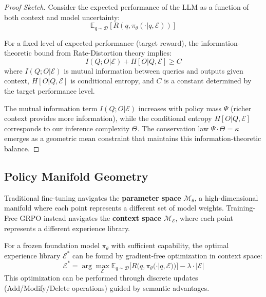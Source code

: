 \begin{proof}[Proof Sketch]
Consider the expected performance of the LLM as a function of both context and model uncertainty:
\begin{equation}
\mathbb{E}_{q \sim \mathcal{D}}[R(q, \pi_\theta(\cdot | q, \mathcal{E}))]
\end{equation}

For a fixed level of expected performance (target reward), the information-theoretic bound from Rate-Distortion theory \cite{cover1999elements} implies:
\begin{equation}
I(Q; O | \mathcal{E}) + H[O | Q, \mathcal{E}] \geq C
\end{equation}
where $I(Q; O | \mathcal{E})$ is mutual information between queries and outputs given context, $H[O | Q, \mathcal{E}]$ is conditional entropy, and $C$ is a constant determined by the target performance level.

The mutual information term $I(Q; O | \mathcal{E})$ increases with policy mass $\Psi$ (richer context provides more information), while the conditional entropy $H[O | Q, \mathcal{E}]$ corresponds to our inference complexity $\Theta$. The conservation law $\Psi \cdot \Theta = \kappa$ emerges as a geometric mean constraint that maintains this information-theoretic balance.
\end{proof}

\subsection{Policy Manifold Geometry}

Traditional fine-tuning navigates the \textbf{parameter space} $\mathcal{M}_\theta$, a high-dimensional manifold where each point represents a different set of model weights. Training-Free GRPO instead navigates the \textbf{context space} $\mathcal{M}_\mathcal{E}$, where each point represents a different experience library.

\begin{proposition}
For a frozen foundation model $\pi_\theta$ with sufficient capability, the optimal experience library $\mathcal{E}^*$ can be found by gradient-free optimization in context space:
\begin{equation}
\mathcal{E}^* = \arg\max_{\mathcal{E}} \mathbb{E}_{q \sim \mathcal{D}}[R(q, \pi_\theta(\cdot | q, \mathcal{E}))] - \lambda \cdot |\mathcal{E}|
\end{equation}
This optimization can be performed through discrete updates (Add/Modify/Delete operations) guided by semantic advantages.
\end{proposition}

